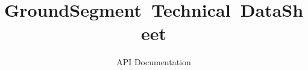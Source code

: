 \documentclass{article}
\begin{document}



\title{GroundSegment~Technical~DataSheet}
\author{API Documentation}
\maketitle


\addtolength{\parskip}{-2ex}
\tableofcontents
\addtolength{\parskip}{2ex}

\end{document}
